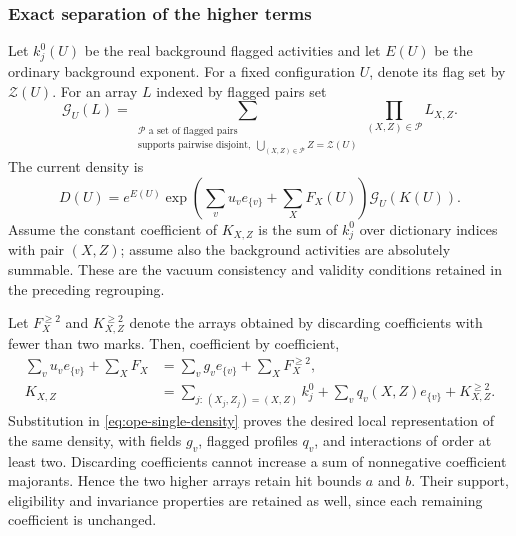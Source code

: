 \subsubsection{Exact separation of the higher terms}
Let $k_j^0(U)$ be the real background flagged activities and let
$E(U)$ be the ordinary background exponent. For a fixed configuration
$U$, denote its flag set by $\mathcal Z(U)$. For an array $L$ indexed
by flagged pairs set
\[
 \mathcal G_U(L)=
 \sum_{\substack{\mathcal P\text{ a set of flagged pairs}\\
           \text{supports pairwise disjoint},\;
           \bigcup_{(X,Z)\in\mathcal P}Z=\mathcal Z(U)}}
                 \prod_{(X,Z)\in\mathcal P}L_{X,Z}.
\]
The current density is
\begin{equation}\label{eq:ope-single-density}
 D(U)=e^{E(U)}\exp\left(\sum_vu_ve_{\{v\}}
                                     +\sum_XF_X(U)\right)
                         \mathcal G_U(K(U)).
\end{equation}
Assume the constant coefficient of $K_{X,Z}$ is the sum of
$k_j^0$ over dictionary indices with pair $(X,Z)$; assume also
the background activities are absolutely summable. These are the
vacuum consistency and validity conditions retained in the preceding
regrouping.

Let $F_X^{\ge2}$ and $K_{X,Z}^{\ge2}$ denote the arrays obtained by
discarding coefficients with fewer than two marks. Then, coefficient
by coefficient,
\begin{align*}
 \sum_vu_ve_{\{v\}}+\sum_XF_X
    &=\sum_vg_ve_{\{v\}}+\sum_XF_X^{\ge2},\\
 K_{X,Z}
    &=\sum_{j:\,(X_j,Z_j)=(X,Z)}k_j^0
       +\sum_v q_v(X,Z)e_{\{v\}}+K_{X,Z}^{\ge2}.
\end{align*}
Substitution in \eqref{eq:ope-single-density} proves the desired
local representation of the same density, with fields $g_v$,
flagged profiles $q_v$, and interactions of order at least two.
Discarding coefficients cannot increase a sum of nonnegative
coefficient majorants. Hence the two higher arrays retain hit bounds
$a$ and $b$. Their support, eligibility and invariance properties
are retained as well, since each remaining coefficient is unchanged.

